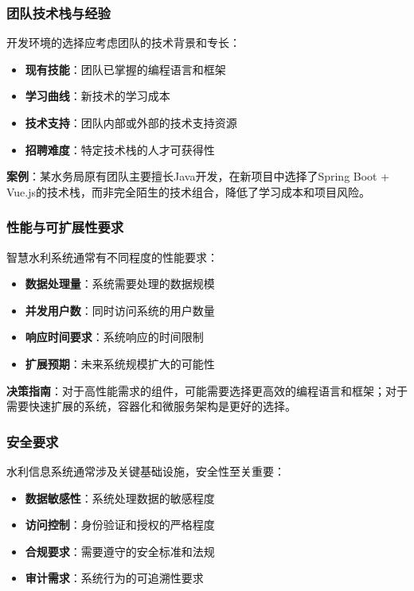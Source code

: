 \subsubsection{团队技术栈与经验}\label{ux56e2ux961fux6280ux672fux6808ux4e0eux7ecfux9a8c}

开发环境的选择应考虑团队的技术背景和专长：

\begin{itemize}
\tightlist
\item
  \textbf{现有技能}：团队已掌握的编程语言和框架
\item
  \textbf{学习曲线}：新技术的学习成本
\item
  \textbf{技术支持}：团队内部或外部的技术支持资源
\item
  \textbf{招聘难度}：特定技术栈的人才可获得性
\end{itemize}

\textbf{案例}：某水务局原有团队主要擅长Java开发，在新项目中选择了Spring
Boot +
Vue.js的技术栈，而非完全陌生的技术组合，降低了学习成本和项目风险。

\subsubsection{性能与可扩展性要求}\label{ux6027ux80fdux4e0eux53efux6269ux5c55ux6027ux8981ux6c42}

智慧水利系统通常有不同程度的性能要求：

\begin{itemize}
\tightlist
\item
  \textbf{数据处理量}：系统需要处理的数据规模
\item
  \textbf{并发用户数}：同时访问系统的用户数量
\item
  \textbf{响应时间要求}：系统响应的时间限制
\item
  \textbf{扩展预期}：未来系统规模扩大的可能性
\end{itemize}

\textbf{决策指南}：对于高性能需求的组件，可能需要选择更高效的编程语言和框架；对于需要快速扩展的系统，容器化和微服务架构是更好的选择。

\subsubsection{安全要求}\label{ux5b89ux5168ux8981ux6c42}

水利信息系统通常涉及关键基础设施，安全性至关重要：

\begin{itemize}
\tightlist
\item
  \textbf{数据敏感性}：系统处理数据的敏感程度
\item
  \textbf{访问控制}：身份验证和授权的严格程度
\item
  \textbf{合规要求}：需要遵守的安全标准和法规
\item
  \textbf{审计需求}：系统行为的可追溯性要求
\end{itemize}

